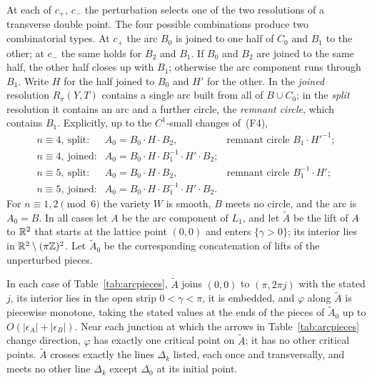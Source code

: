 At each of $c_+$, $c_-$ the perturbation selects one of the two resolutions of a transverse double point.
The four possible combinations produce two combinatorial types. At $c_+$ the arc $B_0$ is joined to one half
of $C_0$ and $B_1$ to the other; at $c_-$ the same holds for $B_2$ and $B_1$. If $B_0$ and $B_2$ are joined to the
same half, the other half closes up with $B_1$; otherwise the arc component runs through $B_1$. Write $H$ for
the half joined to $B_0$ and $H'$ for the other. In the \emph{joined} resolution $R_\pi(Y,T)$ contains a single arc built
from all of $B\cup C_0$; in the \emph{split} resolution it contains an arc and a further circle, the
\emph{remnant circle}, which contains $B_1$. Explicitly, up to the $C^1$-small changes of~(F4),
\[
\begin{array}{lll}
n\equiv4,\ \text{split:} & A_0=B_0\cdot H\cdot B_2, & \text{remnant circle } B_1\cdot H'^{-1};\\
n\equiv4,\ \text{joined:} & A_0=B_0\cdot H\cdot B_1^{-1}\cdot H'\cdot B_2;&\\
n\equiv5,\ \text{split:} & A_0=B_0\cdot H\cdot B_2, & \text{remnant circle } B_1^{-1}\cdot H';\\
n\equiv5,\ \text{joined:} & A_0=B_0\cdot H\cdot B_1^{-1}\cdot H'\cdot B_2.&
\end{array}
\]
For $n\equiv1,2\pmod 6$ the variety $W$ is smooth, $B$ meets no circle, and the arc is $A_0=B$. In all
cases let $A$ be the arc component of $L_1$, and let $\tilde A$ be the lift of $A$ to $\mathbb{R}^2$ that starts at the
lattice point $(0,0)$ and enters $\{\gamma>0\}$; its interior lies in $\mathbb{R}^2\setminus(\pi\mathbb{Z})^2$. Let $\tilde A_0$ be
the corresponding concatenation of lifts of the unperturbed pieces.

\begin{lemma}\label{lem:arcdesc}
In each case of Table~\ref{tab:arcpieces}, $\tilde A$ joins $(0,0)$ to $(\pi,2\pi j)$ with the stated $j$, its
interior lies in the open strip $0<\gamma<\pi$, it is embedded, and $\varphi$ along $\tilde A$ is piecewise
monotone, taking the stated values at the ends of the pieces of $\tilde A_0$ up to $O(|\epsilon_A|+|\epsilon_B|)$. Near each
junction at which the arrows in Table~\ref{tab:arcpieces} change direction, $\varphi$ has exactly one critical
point on $\tilde A$; it has no other critical points. $\tilde A$ crosses exactly the lines
$\Delta_k$ listed, each once and transversally, and meets no other line $\Delta_k$ except $\Delta_0$ at its initial
point.
\end{lemma}

